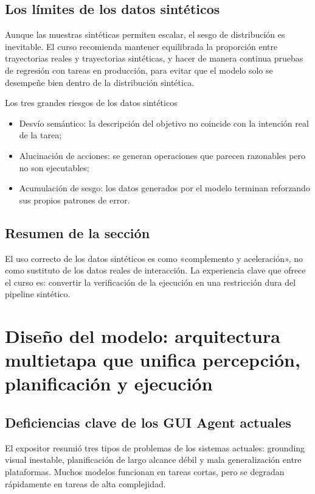 \documentclass[a4paper]{article}
\begin{document}
\subsection{Los límites de los datos sintéticos}
Aunque las muestras sintéticas permiten escalar, el sesgo de distribución es inevitable. El curso recomienda mantener equilibrada la proporción entre trayectorias reales y trayectorias sintéticas, y hacer de manera continua pruebas de regresión con tareas en producción, para evitar que el modelo solo se desempeñe bien dentro de la distribución sintética.

\begin{warningbox}{Los tres grandes riesgos de los datos sintéticos}
\begin{itemize}
    \item Desvío semántico: la descripción del objetivo no coincide con la intención real de la tarea;
    \item Alucinación de acciones: se generan operaciones que parecen razonables pero no son ejecutables;
    \item Acumulación de sesgo: los datos generados por el modelo terminan reforzando sus propios patrones de error.
\end{itemize}
\end{warningbox}

\subsection{Resumen de la sección}
El uso correcto de los datos sintéticos es como «complemento y aceleración», no como sustituto de los datos reales de interacción. La experiencia clave que ofrece el curso es: convertir la verificación de la ejecución en una restricción dura del pipeline sintético.
\section{Diseño del modelo: arquitectura multietapa que unifica percepción, planificación y ejecución}

\subsection{Deficiencias clave de los GUI Agent actuales}
El expositor resumió tres tipos de problemas de los sistemas actuales: grounding visual inestable, planificación de largo alcance débil y mala generalización entre plataformas. Muchos modelos funcionan en tareas cortas, pero se degradan rápidamente en tareas de alta complejidad.
\end{document}
